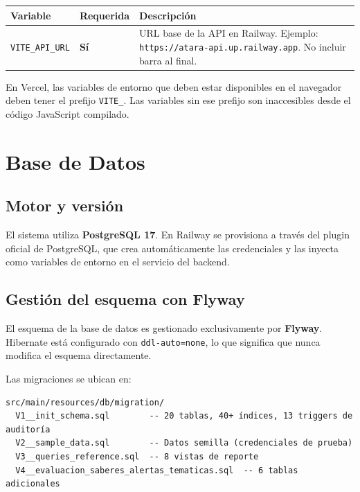 \documentclass[11pt, a4paper]{article}
\begin{document}
\begin{center}
\begin{tabular}{L{4.5cm} L{2.5cm} L{6.5cm}}
\toprule
\textbf{Variable} & \textbf{Requerida} & \textbf{Descripción} \\
\midrule
\texttt{VITE\_API\_URL} & \textbf{Sí} & URL base de la API en Railway. Ejemplo: \texttt{https://atara-api.up.railway.app}. No incluir barra al final. \\
\bottomrule
\end{tabular}
\end{center}

\begin{notabox}
En Vercel, las variables de entorno que deben estar disponibles en el navegador deben tener el prefijo \texttt{VITE\_}. Las variables sin ese prefijo son inaccesibles desde el código JavaScript compilado.
\end{notabox}

\section{Base de Datos}

\subsection{Motor y versión}

El sistema utiliza \textbf{PostgreSQL 17}. En Railway se provisiona a través del plugin oficial de PostgreSQL, que crea automáticamente las credenciales y las inyecta como variables de entorno en el servicio del backend.

\subsection{Gestión del esquema con Flyway}

El esquema de la base de datos es gestionado exclusivamente por \textbf{Flyway}. Hibernate está configurado con \texttt{ddl-auto=none}, lo que significa que nunca modifica el esquema directamente.

Las migraciones se ubican en:

\begin{lstlisting}
src/main/resources/db/migration/
  V1__init_schema.sql        -- 20 tablas, 40+ índices, 13 triggers de auditoría
  V2__sample_data.sql        -- Datos semilla (credenciales de prueba)
  V3__queries_reference.sql  -- 8 vistas de reporte
  V4__evaluacion_saberes_alertas_tematicas.sql  -- 6 tablas adicionales
\end{lstlisting}
\end{document}
